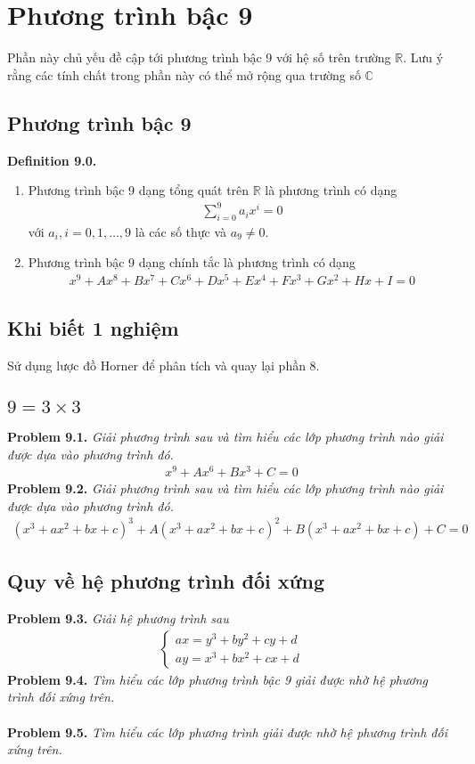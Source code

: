 \documentclass[a4paper,oneside]{book}
\numberwithin{equation}{chapter}
\begin{document}
\chapter{Phương trình bậc 9}
Phần này chủ yếu đề cập tới phương trình bậc 9 với hệ số trên trường $\mathbb{R}$. Lưu ý rằng các tính chất trong phần này có thể mở rộng qua trường số $\mathbb{C}$
\section{Phương trình bậc 9}
\textbf{Definition 9.0.}
\begin{enumerate}
\item Phương trình bậc 9  dạng tổng quát trên $\mathbb{R}$ là phương trình có dạng
\begin{align}
\sum\limits_{i = 0}^9 {{a_i}{x^i}}  = 0
\end{align}
với $a_i,i=0,1,\ldots,9$ là các số thực và $a_9 \ne 0$.
\item Phương trình bậc 9 dạng chính tắc là phương trình có dạng
\begin{align}
{x^9} + A{x^8} + B{x^7} + C{x^6} + D{x^5} + E{x^4} + F{x^3} + G{x^2} + Hx + I = 0
\end{align}
\end{enumerate}
\section{Khi biết 1 nghiệm}
Sử dụng lược đồ Horner để phân tích và quay lại phần 8.
\section{$9=3\times 3$}
\textbf{Problem 9.1.} \textit{Giải phương trình sau và tìm hiểu các lớp phương trình nào giải được dựa vào phương trình đó}.
\begin{align}
{x^9} + A{x^6} + B{x^3} + C = 0
\end{align}
\textbf{Problem 9.2.} \textit{Giải phương trình sau và tìm hiểu các lớp phương trình nào giải được dựa vào phương trình đó.}
\begin{align}
{\left( {x{}^3 + a{x^2} + bx + c} \right)^3} + A{\left( {x{}^3 + a{x^2} + bx + c} \right)^2} + B\left( {x{}^3 + a{x^2} + bx + c} \right) + C = 0
\end{align}
\section{Quy về hệ phương trình đối xứng}
\textbf{Problem 9.3.} \textit{Giải hệ phương trình sau}
\begin{align}
\left\{ {\begin{array}{*{20}{c}}
{ax = y{}^3 + b{y^2} + cy + d}\\
{ay = x{}^3 + b{x^2} + cx + d}
\end{array}} \right.
\end{align}
\textbf{Problem 9.4.} \textit{Tìm hiểu các lớp phương trình bậc 9 giải được nhờ hệ phương trình đối xứng trên.}\\
\\
\textbf{Problem 9.5.} \textit{Tìm hiểu các lớp phương trình giải được nhờ hệ phương trình đối xứng trên.}
\end{document}
